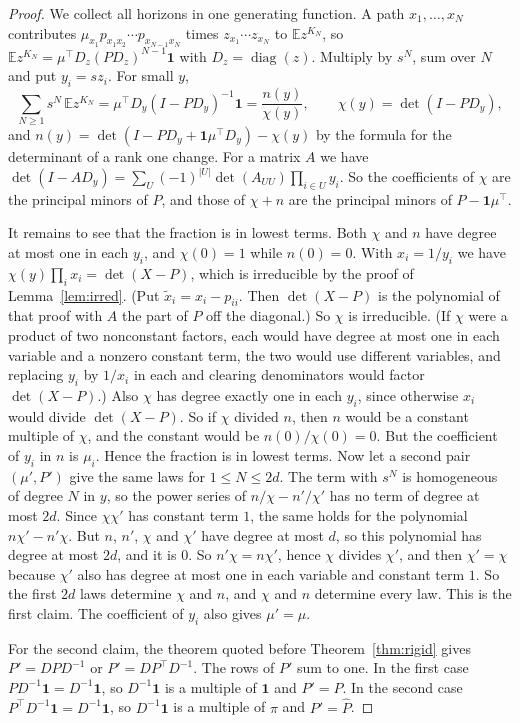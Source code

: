\documentclass[11pt]{article}
\theoremstyle{definition}
\theoremstyle{remark}
\newcommand{\E}{\mathbb E}
\newcommand{\one}{\mathbf 1}
\begin{document}
\begin{proof}
We collect all horizons in one generating function. A path
$x_1,\ldots,x_N$ contributes $\mu_{x_1}p_{x_1x_2}\cdots p_{x_{N-1}x_N}$ times
$z_{x_1}\cdots z_{x_N}$ to $\E z^{K_N}$, so
$\E z^{K_N}=\mu^{\top}D_z(PD_z)^{N-1}\one$ with $D_z=\operatorname{diag}(z)$.
Multiply by $s^N$, sum over $N$ and put $y_i=sz_i$. For small $y$,
\[
 \sum_{N\ge1}s^N\,\E z^{K_N}=\mu^{\top}D_y(I-PD_y)^{-1}\one=\frac{n(y)}{\chi(y)},
 \qquad\chi(y)=\det(I-PD_y),
\]
and $n(y)=\det(I-PD_y+\one\mu^{\top}D_y)-\chi(y)$ by the formula for the
determinant of a rank one change. For a matrix $A$ we have
$\det(I-AD_y)=\sum_U(-1)^{|U|}\det(A_{UU})\prod_{i\in U}y_i$. So the
coefficients of $\chi$ are the principal minors of $P$, and those of $\chi+n$
are the principal minors of $P-\one\mu^{\top}$.

It remains to see that the fraction is in lowest terms. Both $\chi$ and $n$
have degree at most one in each $y_i$, and $\chi(0)=1$ while $n(0)=0$. With
$x_i=1/y_i$ we have $\chi(y)\prod_ix_i=\det(X-P)$, which is irreducible by the
proof of Lemma~\ref{lem:irred}. (Put $\tilde x_i=x_i-p_{ii}$. Then $\det(X-P)$
is the polynomial of that proof with $A$ the part of $P$ off the diagonal.) So $\chi$ is irreducible. (If $\chi$ were a
product of two nonconstant factors, each would have degree at most one in each
variable and a nonzero constant term, the two would use different variables,
and replacing $y_i$ by $1/x_i$ in each and clearing denominators would factor
$\det(X-P)$.) Also $\chi$ has degree exactly one in each $y_i$, since otherwise
$x_i$ would divide $\det(X-P)$. So if $\chi$ divided $n$, then $n$ would be a
constant multiple of $\chi$, and the constant would be $n(0)/\chi(0)=0$. But
the coefficient of $y_i$ in $n$ is $\mu_i$. Hence the fraction is in lowest
terms. Now let a second pair $(\mu',P')$ give the same laws for
$1\le N\le2d$. The term with $s^N$ is homogeneous of degree $N$ in $y$, so the
power series of $n/\chi-n'/\chi'$ has no term of degree at most $2d$. Since
$\chi\chi'$ has constant term $1$, the same holds for the polynomial
$n\chi'-n'\chi$. But $n$, $n'$, $\chi$ and $\chi'$ have degree at most $d$, so
this polynomial has degree at most $2d$, and it is $0$. So $n'\chi=n\chi'$, hence
$\chi$ divides $\chi'$, and then $\chi'=\chi$ because $\chi'$ also has degree
at most one in each variable and constant term $1$. So the first $2d$ laws
determine $\chi$ and $n$, and $\chi$ and $n$ determine every law. This is the
first claim.
The coefficient of $y_i$ also gives $\mu'=\mu$.

For the second claim, the theorem quoted before Theorem~\ref{thm:rigid} gives $P'=DPD^{-1}$ or
$P'=DP^{\top}D^{-1}$. The rows of $P'$ sum to one. In the first case
$PD^{-1}\one=D^{-1}\one$, so $D^{-1}\one$ is a multiple of $\one$ and $P'=P$.
In the second case $P^{\top}D^{-1}\one=D^{-1}\one$, so $D^{-1}\one$ is a
multiple of $\pi$ and $P'=\hat P$.
\end{proof}
\end{document}

